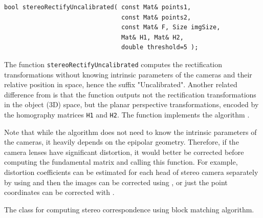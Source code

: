 \begin{lstlisting}
bool stereoRectifyUncalibrated( const Mat& points1,
                                const Mat& points2,
                                const Mat& F, Size imgSize,
                                Mat& H1, Mat& H2,
                                double threshold=5 );
\end{lstlisting}
\begin{description}
\end{description}

The function \texttt{stereoRectifyUncalibrated} computes the rectification transformations without knowing intrinsic parameters of the cameras and their relative position in space, hence the suffix "Uncalibrated". Another related difference from  is that the function outputs not the rectification transformations in the object (3D) space, but the planar perspective transformations, encoded by the homography matrices \texttt{H1} and \texttt{H2}. The function implements the algorithm \cite{Hartley99}. 

Note that while the algorithm does not need to know the intrinsic parameters of the cameras, it heavily depends on the epipolar geometry. Therefore, if the camera lenses have significant distortion, it would better be corrected before computing the fundamental matrix and calling this function. For example, distortion coefficients can be estimated for each head of stereo camera separately by using  and then the images can be corrected using , or just the point coordinates can be corrected with . 

\label{StereoBM}
The class for computing stereo correspondence using block matching algorithm.

